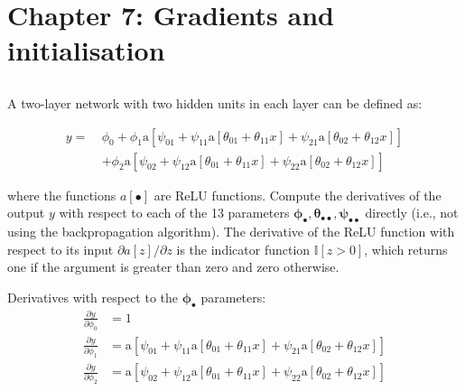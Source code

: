 \documentclass[12pt]{report}
\begin{document}
\section*{Chapter 7: Gradients and initialisation}

\subsection{}
\begin{mdframed}
    A two-layer network with two hidden units in each layer can be defined as:

    \begin{align*}
        y = \  & \phi_{0} + \phi_{1}\text{a}[\psi_{01} + \psi_{11}\text{a}[\theta_{01} + \theta_{11}x]+ \psi_{21}\text{a}[\theta_{02} + \theta_{12}x]] \\
               & + \phi_{2}\text{a}[\psi_{02} + \psi_{12}\text{a}[\theta_{01} + \theta_{11}x]
            + \psi_{22}\text{a}[\theta_{02} + \theta_{12}x]]
    \end{align*}

    where the functions $a[\bullet]$ are ReLU functions. Compute the derivatives of the output $y$ with respect to each of the 13 parameters $\boldsymbol{\phi}_{\bullet}, \boldsymbol{\theta}_{\bullet\bullet}, \boldsymbol{\psi}_{\bullet\bullet}$ directly (i.e., not using the backpropagation algorithm). The derivative of the ReLU function with respect to its input $\partial a[z] / \partial z$ is the indicator function $\mathbb{I}[z > 0]$, which returns one if the argument is greater than zero and zero otherwise.
\end{mdframed}

Derivatives with respect to the $\boldsymbol{\phi}_{\bullet}$ parameters:
\begin{align*}
    \frac{\partial y}{\partial \phi_{0}} & = 1                                                                                                                   \\
    \frac{\partial y}{\partial \phi_{1}} & = \text{a}[\psi_{01} + \psi_{11}\text{a}[\theta_{01} + \theta_{11}x] + \psi_{21}\text{a}[\theta_{02} + \theta_{12}x]] \\
    \frac{\partial y}{\partial \phi_{2}} & = \text{a}[\psi_{02} + \psi_{12}\text{a}[\theta_{01} + \theta_{11}x] + \psi_{22}\text{a}[\theta_{02} + \theta_{12}x]] \\
\end{align*}
\end{document}
